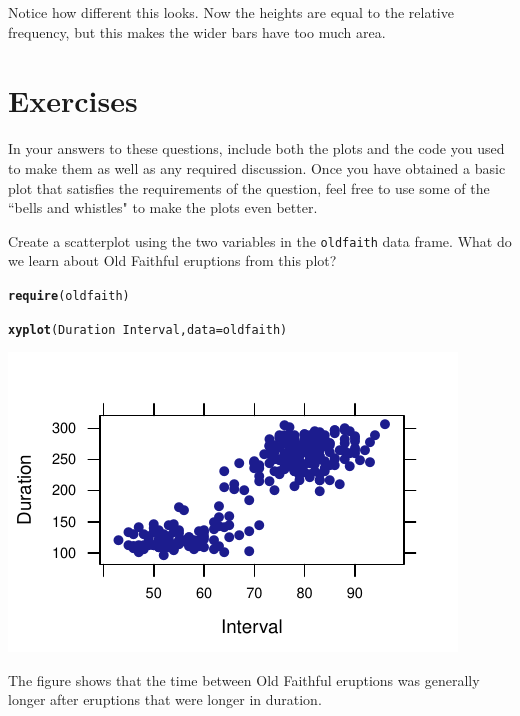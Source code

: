 \documentclass[twoside]{book}\usepackage[]{graphicx}\usepackage[]{xcolor}
\makeatletter
\def\maxwidth{ %
  \ifdim\Gin@nat@width>\linewidth
    \linewidth
  \else
    \Gin@nat@width
  \fi
}
\newcommand{\hlopt}[1]{\textcolor[rgb]{0,0,0}{#1}}%
\newcommand{\hlstd}[1]{\textcolor[rgb]{0.345,0.345,0.345}{#1}}%
\newcommand{\hlkwc}[1]{\textcolor[rgb]{0.333,0.667,0.333}{#1}}%
\newcommand{\hlkwd}[1]{\textcolor[rgb]{0.737,0.353,0.396}{\textbf{#1}}}%
\newenvironment{kframe}{%
 \def\at@end@of@kframe{}%
 \ifinner\ifhmode%
  \def\at@end@of@kframe{\end{minipage}}%
  \begin{minipage}{\columnwidth}%
 \fi\fi%
 \def\FrameCommand##1{\hskip\@totalleftmargin \hskip-\fboxsep
 \colorbox{shadecolor}{##1}\hskip-\fboxsep
     \hskip-\linewidth \hskip-\@totalleftmargin \hskip\columnwidth}%
 \MakeFramed {\advance\hsize-\width
   \@totalleftmargin\z@ \linewidth\hsize
   \@setminipage}}%
 {\par\unskip\endMakeFramed%
 \at@end@of@kframe}
\newenvironment{knitrout}{}{} %
\newcommand{\Rindex}[1]{\index{\texttt{#1}}}
\newcommand{\dataframe}[1]{{\color{blue!80!black}\texttt{#1}}\Rindex{#1}}
\makeatother
\begin{document}
Notice how different this looks.  Now the heights are equal to the relative
frequency, but this makes the wider bars have too much area.

\newpage

\section*{Exercises}

In your answers to these questions, include both the plots and the code you used 
to make them as well as any required discussion.  Once you have obtained a basic
plot that satisfies the requirements of the question, feel free to 
use some of the ``bells and whistles" to make the plots even better.

\begin{problem}
	Create a scatterplot using the two variables in the \dataframe{oldfaith}
	data frame.  What do we learn about Old Faithful eruptions from this plot?
\end{problem}

\begin{solution}
\begin{knitrout}
\color{fgcolor}\begin{kframe}
\begin{alltt}
\hlkwd{require}\hlstd{(oldfaith)}
\end{alltt}


{\ttfamily\noindent\itshape\color{messagecolor}{\#\# Loading required package: oldfaith}}

{\ttfamily\noindent\color{warningcolor}{\#\# Warning in library(package, lib.loc = lib.loc, character.only = TRUE, logical.return = TRUE, : there is no package called 'oldfaith'}}\begin{alltt}
\hlkwd{xyplot}\hlstd{(Duration} \hlopt{~} \hlstd{Interval,} \hlkwc{data} \hlstd{= oldfaith)}
\end{alltt}
\end{kframe}

{\centering \includegraphics[width=\maxwidth]{figures/fig-unnamed-chunk-20-1} 

}



\end{knitrout}
The figure shows that the time between Old Faithful eruptions was generally longer after eruptions that were longer in duration.
\end{solution}
\end{document}
